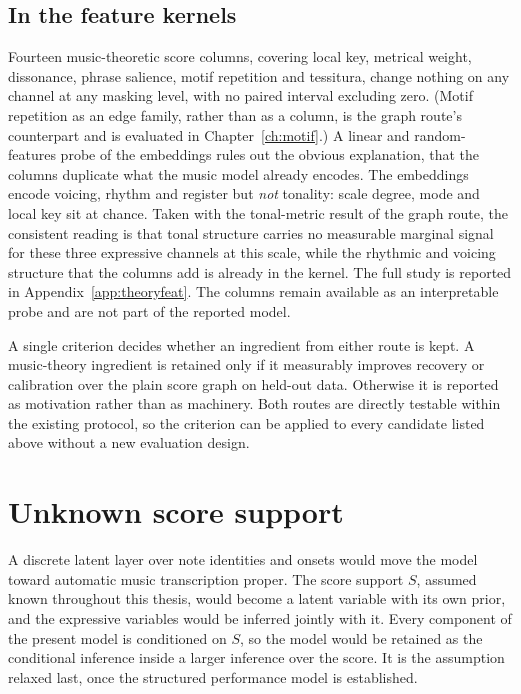 \subsection{In the feature kernels}
Fourteen music-theoretic score columns, covering local key, metrical weight,
dissonance, phrase salience, motif repetition and tessitura, change nothing
on any channel at any masking level, with no paired interval excluding zero.
(Motif repetition as an edge family, rather than as a column, is the graph
route's counterpart and is evaluated in Chapter~\ref{ch:motif}.)
A linear and random-features probe of the embeddings rules out the obvious
explanation, that the columns duplicate what the music model already
encodes. The embeddings encode voicing, rhythm and register but \emph{not}
tonality: scale degree, mode and local key sit at chance. Taken with the
tonal-metric result of the graph route, the consistent reading is that tonal
structure carries no measurable marginal signal for these three expressive
channels at this scale, while the rhythmic and voicing structure that the
columns add is already in the kernel. The full study is reported in
Appendix~\ref{app:theoryfeat}. The columns remain available as an
interpretable probe and are not part of the reported model.

A single criterion decides whether an ingredient from either route is kept.
A music-theory ingredient is retained only if it measurably improves
recovery or calibration over the plain score graph on held-out data.
Otherwise it is reported as motivation rather than as machinery. Both routes
are directly testable within the existing protocol, so the criterion can be
applied to every candidate listed above without a new evaluation design.

\section{Unknown score support}\label{sec:future-amt}
A discrete latent layer over note identities and onsets would move the model
toward automatic music transcription proper. The score support $S$, assumed
known throughout this thesis, would become a latent variable with its own
prior, and the expressive variables would be inferred jointly with it. Every
component of the present model is conditioned on $S$, so the model would be
retained as the conditional inference inside a larger inference over the
score. It is the assumption relaxed last, once the structured performance
model is established.

